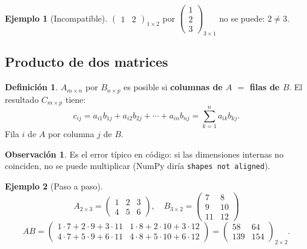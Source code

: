\documentclass[a4paper,12pt]{article}
\theoremstyle{definition}
\newtheorem{definicion}{Definición}[section]
\newtheorem{ejemplo}{Ejemplo}[section]
\newtheorem{observacion}{Observación}[section]
\begin{document}
\begin{ejemplo}[Incompatible]
$\begin{pmatrix} 1 & 2 \end{pmatrix}_{1 \times 2}$ por $\begin{pmatrix} 1 \\ 2 \\ 3 \end{pmatrix}_{3 \times 1}$ no se puede: $2 \neq 3$.
\end{ejemplo}

\subsection{Producto de dos matrices}
\begin{definicion}
$A_{m \times n}$ por $B_{n \times p}$ es posible si \textbf{columnas de $A$ $=$ filas de $B$}. El resultado $C_{m \times p}$ tiene:
\[
c_{ij} = a_{i1}b_{1j}+a_{i2}b_{2j}+\cdots+a_{in}b_{nj} = \sum_{k=1}^{n} a_{ik}b_{kj}.
\]
Fila $i$ de $A$ por columna $j$ de $B$.
\end{definicion}

\begin{observacion}
Es el error típico en código: si las dimensiones internas no coinciden, no se puede multiplicar (NumPy diría \texttt{shapes not aligned}).
\end{observacion}

\begin{ejemplo}[Paso a paso]
\[
A_{2 \times 3} = \begin{pmatrix} 1 & 2 & 3 \\ 4 & 5 & 6 \end{pmatrix}, \quad B_{3 \times 2} = \begin{pmatrix} 7 & 8 \\ 9 & 10 \\ 11 & 12 \end{pmatrix}
\]
\[
AB = \begin{pmatrix}
1\cdot7+2\cdot9+3\cdot11 & 1\cdot8+2\cdot10+3\cdot12 \\
4\cdot7+5\cdot9+6\cdot11 & 4\cdot8+5\cdot10+6\cdot12
\end{pmatrix} = \begin{pmatrix} 58 & 64 \\ 139 & 154 \end{pmatrix}_{2 \times 2}.
\]
\end{ejemplo}
\end{document}
